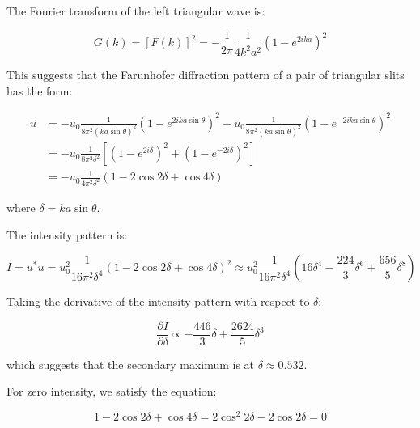 \documentclass[12pt]{article}
\begin{document}
The Fourier transform of the left triangular wave is:

\begin{equation}
    G(k) = \left[ F(k) \right]^{2} = -\frac{1}{2\pi} \frac{1}{4k^{2}a^{2}} \left( 1 - e^{2ika} \right)^{2}
\end{equation}

This suggests that the Farunhofer diffraction pattern of a pair of triangular slits has the form:

\begin{equation}
    \begin{split}
        u &= -u_{0}\frac{1}{8\pi^{2} (ka\sin{\theta})^2} \left( 1 - e^{2ika\sin{\theta}} \right)^{2} - u_{0}\frac{1}{8\pi^{2} (ka\sin{\theta})^2} \left( 1 - e^{-2ika\sin{\theta}} \right)^{2} \\
        &= -u_{0}\frac{1}{8\pi^{2} \delta^{2}} \left[ \left( 1 - e^{2i\delta} \right)^{2} + \left( 1 - e^{-2i\delta} \right)^{2} \right] \\
        &= -u_{0}\frac{1}{4\pi^{2} \delta^{2}} \left( 1 - 2\cos{2\delta} + \cos{4\delta} \right)
    \end{split}
\end{equation}

where $\delta = ka\sin{\theta}$.

The intensity pattern is:

\begin{equation}
    I = u^{*}u = u_{0}^{2}\frac{1}{16 \pi^{2} \delta^{4}} \left( 1 - 2\cos{2\delta} + \cos{4\delta} \right)^{2} \approx u_{0}^{2}\frac{1}{16\pi^{2} \delta^{4}} \left( 16\delta^{4} - \frac{224}{3} \delta^{6} + \frac{656}{5} \delta^{8} \right)
\end{equation}

Taking the derivative of the intensity pattern with respect to $\delta$:

\begin{equation}
    \frac{\partial I}{\partial \delta} \propto -\frac{446}{3} \delta + \frac{2624}{5} \delta^{3}
\end{equation}

which suggests that the secondary maximum is at $\delta \approx 0.532$.

For zero intensity, we satisfy the equation:

\begin{equation}
    1 - 2\cos{2\delta} + \cos{4\delta} = 2\cos^{2}{2\delta} - 2\cos{2\delta} = 0
\end{equation}
\end{document}
